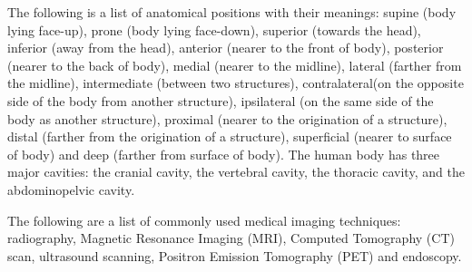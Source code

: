 \documentclass[11pt]{article}
\begin{document}
The following is a list of anatomical positions with their meanings: supine (body lying face-up), prone (body lying face-down), superior (towards the head), inferior (away from the head), anterior (nearer to the front of body), posterior (nearer to the back of body), medial (nearer to the midline), lateral (farther from the midline), intermediate (between two structures), contralateral(on the opposite side of the body from another structure), ipsilateral (on the same side of the body as another structure), proximal (nearer to
the origination of a structure), distal (farther from the origination of a structure), superficial (nearer to surface of body) and deep (farther from surface of body). The human body has three major cavities: the cranial cavity, the vertebral cavity, the thoracic cavity, and the abdominopelvic cavity.

The following are a list of commonly used medical imaging techniques: radiography, Magnetic Resonance Imaging (MRI), Computed Tomography (CT) scan, ultrasound scanning, Positron Emission Tomography (PET) and endoscopy.
\end{document}
